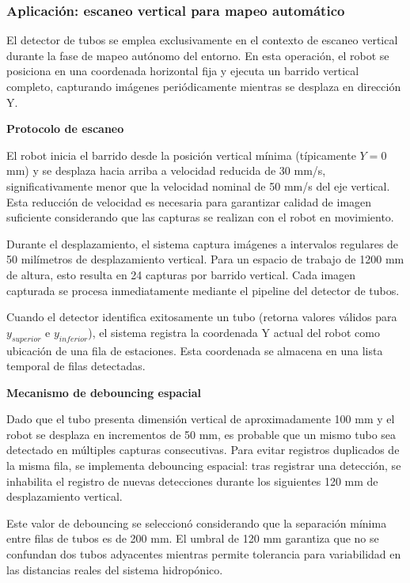 \subsubsection{Aplicación: escaneo vertical para mapeo automático}

El detector de tubos se emplea exclusivamente en el contexto de escaneo vertical durante la fase de mapeo autónomo del entorno. En esta operación, el robot se posiciona en una coordenada horizontal fija y ejecuta un barrido vertical completo, capturando imágenes periódicamente mientras se desplaza en dirección Y.

\textbf{Protocolo de escaneo}

El robot inicia el barrido desde la posición vertical mínima (típicamente $Y = 0$ mm) y se desplaza hacia arriba a velocidad reducida de 30 mm/s, significativamente menor que la velocidad nominal de 50 mm/s del eje vertical. Esta reducción de velocidad es necesaria para garantizar calidad de imagen suficiente considerando que las capturas se realizan con el robot en movimiento.

Durante el desplazamiento, el sistema captura imágenes a intervalos regulares de 50 milímetros de desplazamiento vertical. Para un espacio de trabajo de 1200 mm de altura, esto resulta en 24 capturas por barrido vertical. Cada imagen capturada se procesa inmediatamente mediante el pipeline del detector de tubos.

Cuando el detector identifica exitosamente un tubo (retorna valores válidos para $y_{superior}$ e $y_{inferior}$), el sistema registra la coordenada Y actual del robot como ubicación de una fila de estaciones. Esta coordenada se almacena en una lista temporal de filas detectadas.

\textbf{Mecanismo de debouncing espacial}

Dado que el tubo presenta dimensión vertical de aproximadamente 100 mm y el robot se desplaza en incrementos de 50 mm, es probable que un mismo tubo sea detectado en múltiples capturas consecutivas. Para evitar registros duplicados de la misma fila, se implementa debouncing espacial: tras registrar una detección, se inhabilita el registro de nuevas detecciones durante los siguientes 120 mm de desplazamiento vertical.

Este valor de debouncing se seleccionó considerando que la separación mínima entre filas de tubos es de 200 mm. El umbral de 120 mm garantiza que no se confundan dos tubos adyacentes mientras permite tolerancia para variabilidad en las distancias reales del sistema hidropónico.

